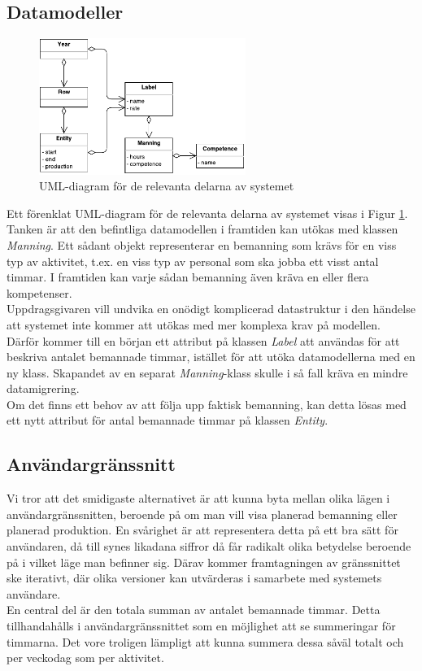 
\subsection{Datamodeller}

\begin{figure}[t]
\centering
\includegraphics[width=0.6\textwidth]{model.pdf}
\caption{UML-diagram för de relevanta delarna av systemet}
\label{fig:model}
\end{figure}

Ett förenklat UML-diagram för de relevanta delarna av systemet visas i
Figur \ref{fig:model}. Tanken är att den befintliga datamodellen i
framtiden kan utökas med klassen \emph{Manning}. Ett sådant objekt
representerar en bemanning som krävs för en viss typ av aktivitet, t.ex.
en viss typ av personal som ska jobba ett visst antal timmar. I
framtiden kan varje sådan bemanning även kräva en eller flera
kompetenser.\\

Uppdragsgivaren vill undvika en onödigt komplicerad datastruktur i den
händelse att systemet inte kommer att utökas med mer komplexa krav på
modellen. Därför kommer till en början ett attribut på klassen
\emph{Label} att användas för att beskriva antalet bemannade timmar,
istället för att utöka datamodellerna med en ny klass. Skapandet av en
separat \emph{Manning}-klass skulle i så fall kräva en mindre
datamigrering.\\

Om det finns ett behov av att följa upp faktisk bemanning, kan detta
lösas med ett nytt attribut för antal bemannade timmar på klassen
\emph{Entity}.


\subsection{Användargränssnitt}

Vi tror att det smidigaste alternativet är att kunna byta mellan olika
lägen i användargränssnitten, beroende på om man vill visa planerad
bemanning eller planerad produktion. En svårighet är att representera
detta på ett bra sätt för användaren, då till synes likadana siffror
då får radikalt olika betydelse beroende på i vilket läge man befinner
sig. Därav kommer framtagningen av gränssnittet ske iterativt, där
olika versioner kan utvärderas i samarbete med systemets användare.\\

En central del är den totala summan av antalet bemannade timmar. Detta
tillhandahålls i användargränssnittet som en möjlighet att se
summeringar för timmarna. Det vore troligen lämpligt att kunna summera
dessa såväl totalt och per veckodag som per aktivitet.\\
